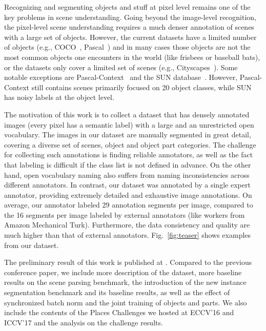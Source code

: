 Recognizing and segmenting objects and stuff at pixel level remains one of the key problems in scene understanding. Going beyond the image-level recognition, the pixel-level scene understanding requires a much denser annotation of scenes with a large set of objects. However, the current datasets have a limited number of objects (e.g., COCO~\cite{lin2014microsoft}, Pascal~\cite{everingham2010pascal}) and in many cases those objects are not the most common objects one encounters in the world (like frisbees or baseball bats), or the datasets only cover a limited set of scenes (e.g., Cityscapes~\cite{Cordts2015Cvprw}). Some notable exceptions are Pascal-Context~\cite{mottaghi2014role} and the SUN database~\cite{xiao2010sun}. However, Pascal-Context still contains scenes primarily focused on 20 object classes, while SUN has noisy labels at the object level. 

The motivation of this work is to collect a dataset that has densely annotated images (every pixel has a semantic label) with a large and an unrestricted open vocabulary. The images in our dataset are manually segmented in great detail, covering a diverse set of scenes, object and object part categories. The challenge for collecting such annotations is finding reliable annotators, as well as the fact that labeling is difficult if the class list is not defined in advance. On the other hand, open vocabulary naming also suffers from naming inconsistencies across different annotators. In contrast, our dataset was annotated by a single expert annotator, providing extremely detailed and exhaustive image annotations. On average, our annotator labeled 29 annotation segments per image, compared to the 16 segments per image labeled by external annotators (like workers from Amazon Mechanical Turk). Furthermore, the data consistency and quality are much higher than that of external annotators. Fig.~\ref{fig:teaser} shows examples from our dataset. 

The preliminary result of this work is published at \cite{zhou2017scene}. Compared to the previous conference paper, we include more description of the dataset, more baseline results on the scene parsing benchmark, the introduction of the new instance segmentation benchmark and its baseline results, as well as the effect of synchronized batch norm and the joint training of objects and parts. We also include the contents of the Places Challenges we hosted at ECCV'16 and ICCV'17 and the analysis on the challenge results.

